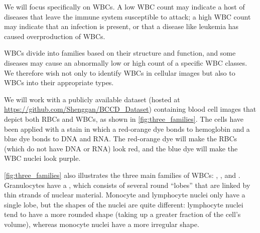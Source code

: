 We will focus specifically on WBCs. A low WBC count may indicate a host of diseases that leave the immune system susceptible to attack; a high WBC count may indicate that an infection is present, or that a disease like leukemia has caused overproduction of WBCs.

WBCs divide into families based on their structure and function, and some diseases may cause an abnormally low or high count of a specific WBC classes. We therefore wish not only to identify WBCs in cellular images but also to  WBCs into their appropriate types.

We will work with a publicly available dataset (hosted at \url{https://github.com/Shenggan/BCCD_Dataset}) containing blood cell images that depict both RBCs and WBCs, as shown in \autoref{fig:three_families}. The cells have been applied with a stain in which a red-orange dye bonds to hemoglobin and a blue dye bonds to DNA and RNA. The red-orange dye will make the RBCs (which do not have DNA or RNA) look red, and the blue dye will make the WBC nuclei look purple.

\autoref{fig:three_families} also illustrates the three main families of WBCs: , , and .  Granulocytes have a , which consists of several round “lobes” that are linked by thin strands of nuclear material. Monocyte and lymphocyte nuclei only have a single lobe, but the shapes of the nuclei are quite different: lymphocyte nuclei tend to have a more rounded shape (taking up a greater fraction of the cell’s volume), whereas monocyte nuclei have a more irregular shape.

